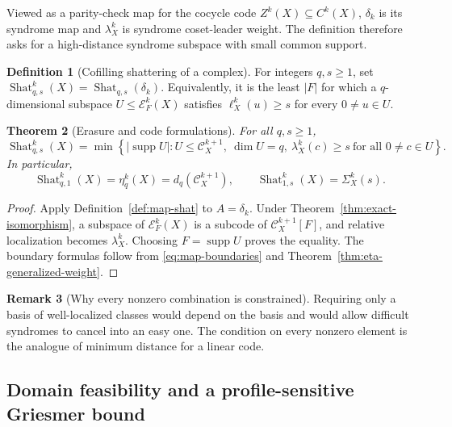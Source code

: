 \documentclass[11pt,letterpaper]{article}
\theoremstyle{plain}
\newtheorem{theorem}{Theorem}[section]
\theoremstyle{definition}
\newtheorem{definition}[theorem]{Definition}
\newtheorem{remark}[theorem]{Remark}
\newcommand{\cC}{\mathcal{C}}
\newcommand{\cE}{\mathcal{E}}
\newcommand{\supp}{\operatorname{supp}}
\newcommand{\Shat}{\operatorname{Shat}}
\newcommand{\1}{\mathbf{1}}
\newcommand{\abs}[1]{\left|#1\right|}
\newcommand{\set}[1]{\left\{#1\right\}}
\begin{document}
Viewed as a parity-check map for the cocycle code $Z^k(X)\subseteq C^k(X)$,
$\delta_k$ is its syndrome map and $\lambda_X^k$ is syndrome coset-leader weight.
The definition therefore asks for a high-distance syndrome subspace with small common
support.

\begin{definition}[Cofilling shattering of a complex]\label{def:shat}
For integers $q,s\ge1$, set
$\Shat_{q,s}^k(X)=\Shat_{q,s}(\delta_k)$.  Equivalently, it is the least
$\abs F$ for which a $q$-dimensional subspace $U\le\cE_F^k(X)$ satisfies
$\ell_X^k(u)\ge s$ for every $0\ne u\in U$.
\end{definition}

\begin{theorem}[Erasure and code formulations]\label{thm:shat-code}
For all $q,s\ge1$,
\begin{equation}\label{eq:shat-code}
 \Shat_{q,s}^k(X)=
 \min\set{\abs{\supp U}:
 U\le\cC_X^{k+1},\ \dim U=q,\
 \lambda_X^k(c)\ge s\ \text{for all }0\ne c\in U}.
\end{equation}
In particular,
\begin{equation}\label{eq:shat-boundaries}
 \Shat_{q,1}^k(X)=\eta_q^k(X)=d_q(\cC_X^{k+1}),
 \qquad \Shat_{1,s}^k(X)=\Sigma_X^k(s).
\end{equation}
\end{theorem}

\begin{proof}
Apply Definition~\ref{def:map-shat} to $A=\delta_k$.  Under
Theorem~\ref{thm:exact-isomorphism}, a subspace of $\cE_F^k(X)$ is a subcode
of $\cC_X^{k+1}[F]$, and relative localization becomes $\lambda_X^k$.
Choosing $F=\supp U$ proves the equality.  The boundary formulas follow from
\eqref{eq:map-boundaries} and Theorem~\ref{thm:eta-generalized-weight}.
\end{proof}

\begin{remark}[Why every nonzero combination is constrained]
\label{rem:all-combinations}
Requiring only a basis of well-localized classes would depend on the basis and
would allow difficult syndromes to cancel into an easy one.  The condition on
every nonzero element is the analogue of minimum distance for a linear code.
\end{remark}

\subsection{Domain feasibility and a profile-sensitive Griesmer bound}
\end{document}
